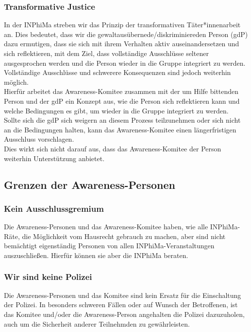 \documentclass{article}
\begin{document}
\subsubsection{Transformative Justice}

In der INPhiMa streben wir das Prinzip der transformativen Täter*innenarbeit an.
Dies bedeutet, dass wir die gewaltausübernede/diskriminiereden Person (gdP) dazu ermutigen, 
dass sie sich mit ihrem Verhalten aktiv auseinandersetzen und sich reflektieren,
mit dem Ziel, dass vollständige Ausschlüsse seltener ausgesprochen werden und die Person wieder in die Gruppe integriert zu werden.\\
Vollständige Ausschlüsse und schwerere Konsequenzen sind jedoch weiterhin möglich.\\

Hierfür arbeitet das Awareness-Komitee zusammen mit der um Hilfe bittenden Person
und der gdP ein Konzept aus, wie die Person sich
reflektieren kann und welche Bedingungen es gibt, um wieder in die Gruppe integriert zu werden.\\

Sollte sich die gdP sich weigern an diesem Prozess teilzunehmen oder sich nicht an die Bedingungen halten,
kann das Awareness-Komitee einen längerfristigen Ausschluss vorschlagen.\\
Dies wirkt sich nicht darauf aus, dass das Awareness-Komitee der Person weiterhin Unterstützung anbietet.\\

\subsection{Grenzen der Awareness-Personen}

\subsubsection{Kein Ausschlussgremium}
Die Awareness-Personen und das Awareness-Komitee haben, wie alle INPhiMa-Räte, die Möglichkeit vom Hausrecht gebrauch zu machen, aber sind nicht bemächtigt eigenständig Personen von allen INPhiMa-Veranstaltungen auszuschließen. Hierfür können sie aber die INPhiMa beraten.

\subsubsection{Wir sind keine Polizei}
Die Awareness-Personen und das Komitee sind kein Ersatz für die Einschaltung der Polizei. In besonders schweren Fällen oder auf Wunsch der Betroffenen, ist das Komitee und/oder die Awareness-Person angehalten die Polizei dazuzuholen, auch um die Sicherheit anderer Teilnehmden zu gewährleisten.
\end{document}
